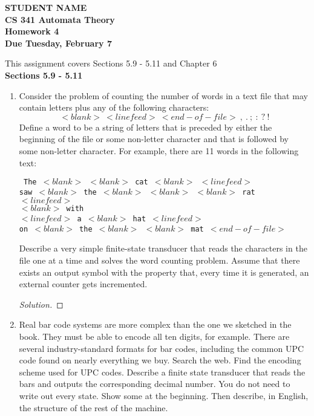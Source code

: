 \documentclass[10pt]{article}
\begin{document}
\begin{flushleft}
\textbf{
STUDENT NAME\\
CS 341 Automata Theory \\
Homework 4 \\
Due Tuesday, February 7}\\
\end{flushleft}
\noindent
This assignment covers Sections 5.9 - 5.11 and Chapter 6 \\

\noindent
\textbf{Sections 5.9 - 5.11}
\begin{enumerate}[1)]
\addtocounter{enumi}{14}

\item
Consider the problem of counting the number of words in a text file that may contain letters plus any  of the following characters:
\[<blank>\ <linefeed>\ <end-of-file>\ ,\ .\ ;\ :\ ?\ !\]
Define a word to be a string of letters that is preceded by either the beginning of the file or some non-letter character and that is followed by some non-letter character.  For example, there are 11 words in the following text:
\begin{flushleft}

\parindent 2cm

\texttt{\noindent
\hspace{2cm}The $<blank>$ $<blank>$ cat $<blank>$ $<linefeed>$\\
saw $<blank>$ the $<blank>$ $<blank>$ $<blank>$ rat $<linefeed>$\\
$<blank>$ with\\
$<linefeed>$ a $<blank>$ hat $<linefeed>$\\
on $<blank>$ the $<blank>$ $<blank>$ mat $<end-of-file>$
}
\end{flushleft}
Describe a very simple finite-state transducer that reads the characters in the file one at a time and solves the word counting problem.  Assume that there exists an output symbol with the property that, every time it is generated, an 
external counter gets incremented.

\begin{proof}[Solution]
\end{proof}

\addtocounter{enumi}{1}

\item
Real bar code systems are more complex than the one we sketched in the book.  They 
must be able to encode all ten digits, for example.  There are several industry-standard 
formats for bar codes, including the common UPC code found on nearly everything we 
buy.  Search the web.  Find the encoding scheme used for UPC codes.  Describe a finite 
state transducer that reads the bars and outputs the corresponding decimal number.  You do 
not need to write out every state.  Show some at the beginning.  Then describe, in English, 
the structure of the rest of the machine.


\end{enumerate}
\end{document}
